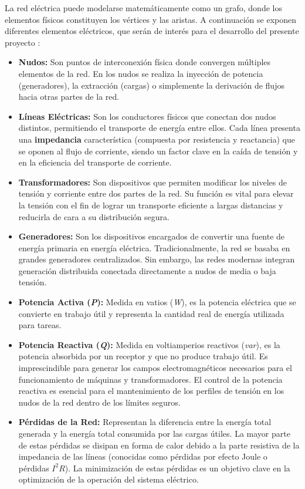 La red eléctrica puede modelarse matemáticamente como un grafo, donde los elementos físicos constituyen los vértices y las aristas. A continuación se exponen diferentes elementos eléctricos, que serán de interés para el desarrollo del presente proyecto \cite{glosario-iberdrola}:
\begin{itemize}
	\item \textbf{Nudos:} Son puntos de interconexión física donde convergen múltiples elementos de la red. En los nudos se realiza la inyección de potencia (generadores), la extracción (cargas) o simplemente la derivación de flujos hacia otras partes de la red.
	\item \textbf{Líneas Eléctricas:} Son los conductores físicos que conectan dos nudos distintos, permitiendo el transporte de energía entre ellos. Cada línea presenta una \textbf{impedancia} característica (compuesta por resistencia y reactancia) que se oponen al flujo de corriente, siendo un factor clave en la caída de tensión y en la eficiencia del transporte de corriente.
	\item \textbf{Transformadores:} Son dispositivos que permiten modificar los niveles de tensión y corriente entre dos partes de la red. Su función es vital para elevar la tensión con el fin de lograr un transporte eficiente a largas distancias y reducirla de cara a su distribución segura. 
	\item \textbf{Generadores:} Son los dispositivos encargados de convertir una fuente de energía primaria en energía eléctrica. Tradicionalmente, la red se basaba en grandes generadores centralizados. Sin embargo, las redes modernas integran generación distribuida conectada directamente a nudos de media o baja tensión.
	\item \textbf{Potencia Activa (\textit{P}):} Medida en vatios (\textit{W}), es la potencia eléctrica que se convierte en trabajo útil y representa la cantidad real de energía utilizada para tareas.
	\item \textbf{Potencia Reactiva (\textit{Q}):} Medida en voltiamperios reactivos (\textit{var}), es la potencia absorbida por un receptor y que no produce trabajo útil. Es imprescindible para generar los campos electromagnéticos necesarios para el funcionamiento de máquinas y transformadores. El control de la potencia reactiva es esencial para el mantenimiento de los perfiles de tensión en los nudos de la red dentro de los límites seguros.
	\item \textbf{Pérdidas de la Red:} Representan la diferencia entre la energía total generada y la energía total consumida por las cargas útiles. La mayor parte de estas pérdidas se disipan en forma de calor debido a la parte resistiva de la impedancia de las líneas (conocidas como pérdidas por efecto Joule o pérdidas $I^2R$). La minimización de estas pérdidas es un objetivo clave en la optimización de la operación del sistema eléctrico.
\end{itemize}

